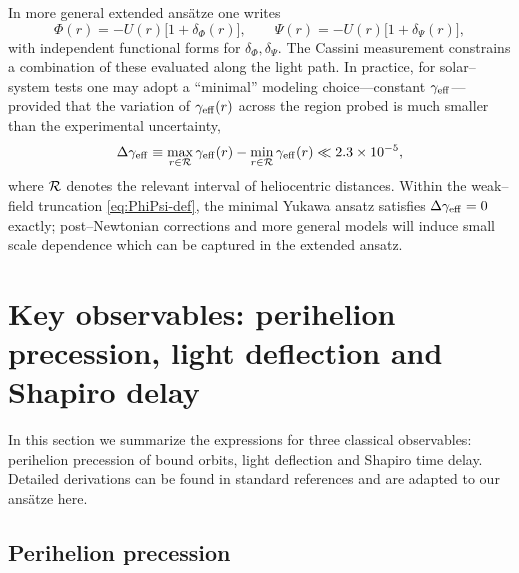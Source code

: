 \documentclass[11pt,a4paper]{article}
\begin{document}
In more general extended ans\"atze one writes
\begin{equation}
\Phi(r) = -U(r)\bigl[1 + \delta_\Phi(r)\bigr],\qquad
\Psi(r) = -U(r)\bigl[1 + \delta_\Psi(r)\bigr], 
\end{equation}
with independent functional forms for $\delta_\Phi,\delta_\Psi$. The Cassini measurement constrains a combination of these evaluated along the light path. In practice, for solar--system tests one may adopt a ``minimal'' modeling choice---constant $\gamma_{\rm eff}$---provided that the variation of $\gamma_{\rm eff}(r)$ across the region probed is much smaller than the experimental uncertainty,
\begin{equation}
\Delta\gamma_{\rm eff} \equiv \max_{r\in{\cal R}}\gamma_{\rm eff}(r) - \min_{r\in{\cal R}}\gamma_{\rm eff}(r) \ll 2.3\times 10^{-5},
\end{equation}
where ${\cal R}$ denotes the relevant interval of heliocentric distances. Within the weak--field truncation \eqref{eq:PhiPsi-def}, the minimal Yukawa ansatz satisfies $\Delta\gamma_{\rm eff}=0$ exactly; post--Newtonian corrections and more general models will induce small scale dependence which can be captured in the extended ansatz.

\section{Key observables: perihelion precession, light deflection and Shapiro delay}
\label{sec:observables}

In this section we summarize the expressions for three classical observables: perihelion precession of bound orbits, light deflection and Shapiro time delay. Detailed derivations can be found in standard references \cite{Wald1984,Will2014,AdkinsMcDonnell2007} and are adapted to our ans\"atze here.

\subsection{Perihelion precession}
\end{document}
